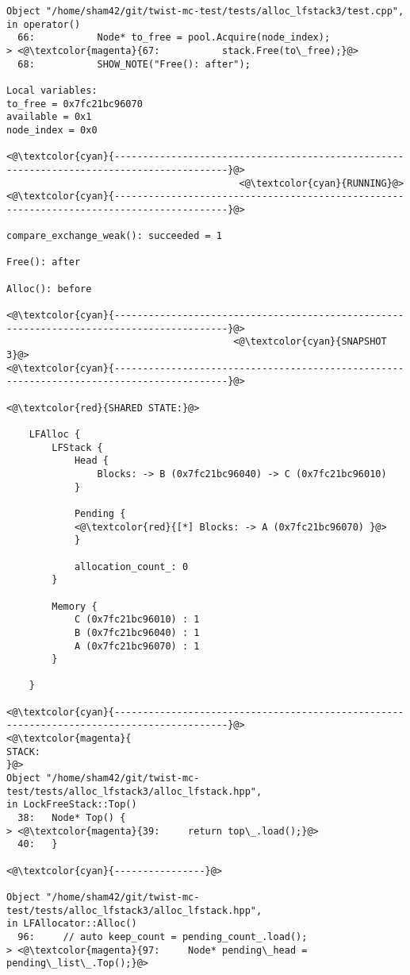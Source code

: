 \begin{adjustwidth}{-3.3cm}{-1cm}
\begin{allintypewriter}
\begin{multicols*}{2}
\begin{lstlisting}[numbers=none]
Object "/home/sham42/git/twist-mc-test/tests/alloc_lfstack3/test.cpp",
in operator()
  66:           Node* to_free = pool.Acquire(node_index);
> <@\textcolor{magenta}{67:           stack.Free(to\_free);}@>
  68:           SHOW_NOTE("Free(): after");

Local variables: 
to_free = 0x7fc21bc96070
available = 0x1
node_index = 0x0

<@\textcolor{cyan}{------------------------------------------------------------------------------------------}@>
                                         <@\textcolor{cyan}{RUNNING}@>
<@\textcolor{cyan}{------------------------------------------------------------------------------------------}@>

compare_exchange_weak(): succeeded = 1

Free(): after

Alloc(): before

<@\textcolor{cyan}{------------------------------------------------------------------------------------------}@>
                                        <@\textcolor{cyan}{SNAPSHOT 3}@>
<@\textcolor{cyan}{------------------------------------------------------------------------------------------}@>

<@\textcolor{red}{SHARED STATE:}@>

    LFAlloc {
	    LFStack {
		    Head {
			    Blocks: -> B (0x7fc21bc96040) -> C (0x7fc21bc96010) 
		    }

		    Pending {
			<@\textcolor{red}{[*] Blocks: -> A (0x7fc21bc96070) }@>
		    }

		    allocation_count_: 0
	    }

	    Memory {
		    C (0x7fc21bc96010) : 1
		    B (0x7fc21bc96040) : 1
		    A (0x7fc21bc96070) : 1
	    }

    }

<@\textcolor{cyan}{------------------------------------------------------------------------------------------}@>
<@\textcolor{magenta}{
STACK:
}@>
Object "/home/sham42/git/twist-mc-test/tests/alloc_lfstack3/alloc_lfstack.hpp",
in LockFreeStack::Top()
  38:   Node* Top() {
> <@\textcolor{magenta}{39:     return top\_.load();}@>
  40:   }

<@\textcolor{cyan}{----------------}@>

Object "/home/sham42/git/twist-mc-test/tests/alloc_lfstack3/alloc_lfstack.hpp",
in LFAllocator::Alloc()
  96:     // auto keep_count = pending_count_.load();
> <@\textcolor{magenta}{97:     Node* pending\_head = pending\_list\_.Top();}@>


\end{lstlisting}
\end{multicols*}
\end{allintypewriter}
\end{adjustwidth}
